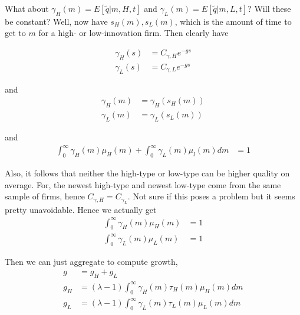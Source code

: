 \documentclass[12pt,english]{article}
\theoremstyle{remark}
\begin{document}
What about $\gamma_H(m) = E[\tilde{q}|m,H,t]$ and $\gamma_L(m) = E[\tilde{q}|m,L,t]$? Will these be constant? Well, now have $s_H(m),s_L(m)$, which is the amount of time to get to $m$ for a high- or low-innovation firm. Then clearly have

\begin{align*}
	\gamma_H(s) &= C_{\gamma,H}e^{-gs} \\
	\gamma_L(s) &= C_{\gamma,L}e^{-gs}
\end{align*}


and
\begin{align*}
	\gamma_H(m) &= \gamma_H(s_H(m)) \\
	\gamma_L(m) &= \gamma_L(s_L(m))
\end{align*}

and
\begin{align*}
	\int_0^{\infty} \gamma_H(m) \mu_H(m) + \int_0^{\infty} \gamma_L(m) \mu_l(m) dm &= 1
\end{align*}

Also, it follows that neither the high-type or low-type can be higher quality on average. For, the newest high-type and newest low-type come from the same sample of firms, hence $C_{\gamma,H} = C_{\gamma_L}$. Not sure if this poses a problem but it seems pretty unavoidable. Hence we actually get 
\begin{align*}
	\int_0^{\infty} \gamma_H(m) \mu_H(m) &= 1 \\
	\int_0^{\infty} \gamma_L(m) \mu_L(m) &= 1
\end{align*}



Then we can just aggregate to compute growth, 
\begin{align*}
	g &= g_H + g_L \\
	g_H &= (\lambda -1)\int_0^{\infty} \gamma_H(m) \tau_H(m) \mu_H(m) dm \\
	g_L &= (\lambda -1)\int_0^{\infty} \gamma_L(m) \tau_L(m) \mu_L(m) dm
\end{align*}
\end{document}
